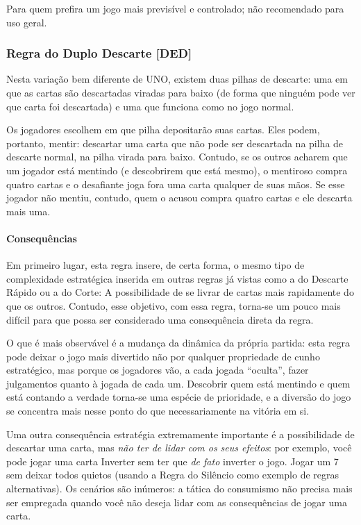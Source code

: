 Para quem prefira um jogo mais previsível e controlado; não recomendado para uso geral.

\subsubsection{Regra do Duplo Descarte [DED]}

Nesta variação bem diferente de UNO, existem duas pilhas de descarte: uma em que as cartas são descartadas viradas para baixo (de forma que ninguém pode ver que carta foi descartada) e uma que funciona como no jogo normal.

Os jogadores escolhem em que pilha depositarão suas cartas. Eles podem, portanto, mentir: descartar uma carta que não pode ser descartada na pilha de descarte normal, na pilha virada para baixo. Contudo, se os outros acharem que um jogador está mentindo (e descobrirem que está mesmo), o mentiroso compra quatro cartas e o desafiante joga fora uma carta qualquer de suas mãos. Se esse jogador não mentiu, contudo, quem o acusou compra quatro cartas e ele descarta mais uma.

\paragraph{Consequências}

Em primeiro lugar, esta regra insere, de certa forma, o mesmo tipo de complexidade estratégica inserida em outras regras já vistas como a do Descarte Rápido ou a do Corte: A possibilidade de se livrar de cartas mais rapidamente do que os outros. Contudo, esse objetivo, com essa regra, torna-se um pouco mais difícil para que possa ser considerado uma consequência direta da regra.

O que é mais observável é a mudança da dinâmica da própria partida: esta regra pode deixar o jogo mais divertido não por qualquer propriedade de cunho estratégico, mas porque os jogadores vão, a cada jogada ``oculta'', fazer julgamentos quanto à jogada de cada um. Descobrir quem está mentindo e quem está contando a verdade torna-se uma espécie de prioridade, e a diversão do jogo se concentra mais nesse ponto do que necessariamente na vitória em si.

Uma outra consequência estratégia extremamente importante é a possibilidade de descartar uma carta, mas \emph{não ter de lidar com os seus efeitos}: por exemplo, você pode jogar uma carta Inverter sem ter que \emph{de fato} inverter o jogo. Jogar um 7 sem deixar todos quietos (usando a Regra do Silêncio como exemplo de regras alternativas). Os cenários são inúmeros: a tática do consumismo não precisa mais ser empregada quando você não deseja lidar com as consequências de jogar uma carta.

